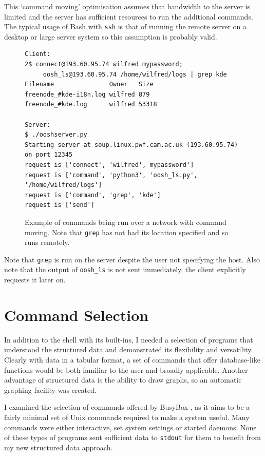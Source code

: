 \documentclass[12pt,twoside,notitlepage]{report}
\begin{document}
This `command moving' optimisation assumes that bandwidth to the
server is limited and the server has sufficient resources to run the
additional commands. The typical usage of Bash with {\tt ssh} is
that of running the remote server on a desktop or large server system
so this assumption is probably valid.

\begin{figure}
\begin{verbatim}
Client:
2$ connect@193.60.95.74 wilfred mypassword;
     oosh_ls@193.60.95.74 /home/wilfred/logs | grep kde
Filename               Owner   Size
freenode_#kde-i18n.log wilfred 879
freenode_#kde.log      wilfred 53318

Server:
$ ./ooshserver.py
Starting server at soup.linux.pwf.cam.ac.uk (193.60.95.74) on port 12345
request is ['connect', 'wilfred', mypassword']
request is ['command', 'python3', 'oosh_ls.py', '/home/wilfred/logs']
request is ['command', 'grep', 'kde']
request is ['send']
\end{verbatim}
  \caption{Example of commands being run over a network with command
    moving. Note that {\tt grep} has not had its location specified
    and so runs remotely.}
  \label{grepexample}
\end{figure}

Note that {\tt grep} is run on the server despite the user not specifying
the host. Also note that the output of {\tt oosh\_ls} is not sent
immediately, the client explicitly requests it later on.

\section{Command Selection}
In addition to the shell with its built-ins, I needed a selection of
programs that understood the structured data and demonstrated its
flexibility and versatility. Clearly with data in a tabular format, a
set of commands that offer database-like functions would be both
familiar to the user and broadly applicable. Another advantage
of structured data is the ability to draw graphs, so an automatic
graphing facility was created.

I examined the selection of commands offered by BusyBox
\cite{busybox}, as it aims to be a fairly minimal set of Unix commands
required to make a system useful. Many commands were either
interactive, set system settings or started daemons. None of these
types of programs sent sufficient data to {\tt stdout} for them to
benefit from my new structured data approach.
\end{document}
